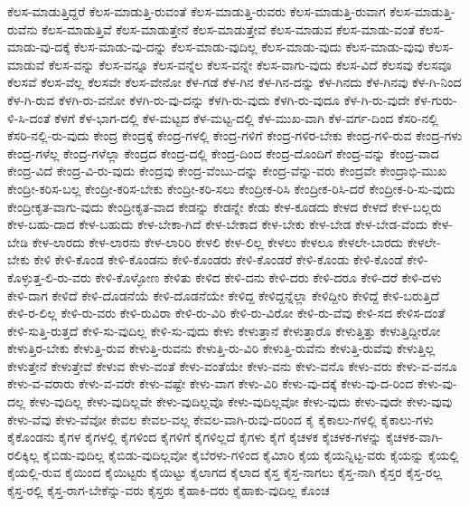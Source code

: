 {ಕೆಲಸ-ಮಾಡುತ್ತಿದ್ದರೆ
ಕೆಲಸ-ಮಾಡುತ್ತಿ-ರುವಂತೆ
ಕೆಲಸ-ಮಾಡುತ್ತಿ-ರುವರು
ಕೆಲಸ-ಮಾಡುತ್ತಿ-ರುವಾಗ
ಕೆಲಸ-ಮಾಡುತ್ತಿ-ರುವೆನು
ಕೆಲಸ-ಮಾಡುತ್ತಿವೆ
ಕೆಲಸ-ಮಾಡುತ್ತೇನೆ
ಕೆಲಸ-ಮಾಡುತ್ತೇವೆ
ಕೆಲಸ-ಮಾಡುವ
ಕೆಲಸ-ಮಾಡು-ವಂತೆ
ಕೆಲಸ-ಮಾಡು-ವು-ದಕ್ಕೆ
ಕೆಲಸ-ಮಾಡು-ವು-ದನ್ನು
ಕೆಲಸ-ಮಾಡು-ವುದಿಲ್ಲ
ಕೆಲಸ-ಮಾಡು-ವುದು
ಕೆಲಸ-ಮಾಡು-ವುವು
ಕೆಲಸ-ಮಾಡುವೆ
ಕೆಲಸ-ವನ್ನು
ಕೆಲಸ-ವನ್ನೂ
ಕೆಲಸ-ವನ್ನೆಲ
ಕೆಲಸ-ವನ್ನೇ
ಕೆಲಸ-ವಾಗು-ವುದು
ಕೆಲಸ-ವಿದೆ
ಕೆಲಸವು
ಕೆಲಸವೂ
ಕೆಲಸವೆ
ಕೆಲಸ-ವೆಲ್ಲ
ಕೆಲಸವೇ
ಕೆಲಸ-ವೇನೋ
ಕೆಳ-ಗಡೆ
ಕೆಳ-ಗಿನ
ಕೆಳ-ಗಿನ-ದನ್ನು
ಕೆಳ-ಗಿನದು
ಕೆಳ-ಗಿನವು
ಕೆಳ-ಗಿ-ನಿಂದ
ಕೆಳ-ಗಿ-ರುವ
ಕೆಳಗಿ-ರು-ವನೋ
ಕೆಳಗಿ-ರು-ವು-ದನ್ನು
ಕೆಳಗಿ-ರು-ವುದು
ಕೆಳಗಿ-ರು-ವುದೂ
ಕೆಳ-ಗಿ-ರು-ವುದೇ
ಕೆಳ-ಗುರು-ಳಿ-ಸಿ-ದಂತೆ
ಕೆಳಗೆ
ಕೆಳ-ಭಾಗ-ದಲ್ಲಿ
ಕೆಳ-ಮಟ್ಟದ
ಕೆಳ-ಮಟ್ಟ-ದಲ್ಲಿ
ಕೆಳ-ಮುಖ-ವಾಗಿ
ಕೆಳ-ವರ್ಗ-ದಿಂದ
ಕೆಸರಿ-ನಲ್ಲಿ
ಕೆಸರಿ-ನಲ್ಲಿ-ರು-ವುದು
ಕೇಂದ್ರ
ಕೇಂದ್ರಕ್ಕೆ
ಕೇಂದ್ರ-ಗಳಲ್ಲಿ
ಕೇಂದ್ರ-ಗಳಿಗೆ
ಕೇಂದ್ರ-ಗಳಿರ-ಬೇಕು
ಕೇಂದ್ರ-ಗಳಿ-ರುವ
ಕೇಂದ್ರ-ಗಳು
ಕೇಂದ್ರ-ಗಳೆಲ್ಲ
ಕೇಂದ್ರ-ಗಳೆಲ್ಲಾ
ಕೇಂದ್ರದ
ಕೇಂದ್ರ-ದಲ್ಲಿ
ಕೇಂದ್ರ-ದಿಂದ
ಕೇಂದ್ರ-ದೊಂದಿಗೆ
ಕೇಂದ್ರ-ವನ್ನು
ಕೇಂದ್ರ-ವಾದ
ಕೇಂದ್ರ-ವಿದೆ
ಕೇಂದ್ರ-ವಿ-ರು-ವುದು
ಕೇಂದ್ರವು
ಕೇಂದ್ರ-ವೆಂಬು-ದನ್ನು
ಕೇಂದ್ರ-ವೆನ್ನು-ವರು
ಕೇಂದ್ರವೇ
ಕೇಂದ್ರಾಭಿ-ಮುಖ
ಕೇಂದ್ರೀ-ಕರಿಸ-ಬಲ್ಲ
ಕೇಂದ್ರೀ-ಕರಿಸ-ಬೇಕು
ಕೇಂದ್ರೀ-ಕರಿ-ಸಲು
ಕೇಂದ್ರೀಕ-ರಿಸಿ
ಕೇಂದ್ರೀಕ-ರಿಸಿ-ದರೆ
ಕೇಂದ್ರೀಕ-ರಿ-ಸು-ವುದು
ಕೇಂದ್ರೀಕೃತ-ವಾಗು-ವುದು
ಕೇಂದ್ರೀಕೃತ-ವಾದ
ಕೇಡನ್ನು
ಕೇಡನ್ನೇ
ಕೇಡು
ಕೇಳ-ಕೂಡದು
ಕೇಳದ
ಕೇಳದೆ
ಕೇಳ-ಬಲ್ಲರು
ಕೇಳ-ಬಹು-ದಾದ
ಕೇಳ-ಬಹುದು
ಕೇಳ-ಬೇಕಾ-ಗಿದೆ
ಕೇಳ-ಬೇಕಾದ
ಕೇಳ-ಬೇಕು
ಕೇಳ-ಬೇಡ
ಕೇಳ-ಬೇಡ-ವೆಂದು
ಕೇಳ-ಬೇಡಿ
ಕೇಳ-ಲಾರದು
ಕೇಳ-ಲಾರನು
ಕೇಳ-ಲಾರಿರಿ
ಕೇಳಲಿ
ಕೇಳ-ಲಿಲ್ಲ
ಕೇಳಲು
ಕೇಳಲೂ
ಕೇಳಲೇ-ಬಾರದು
ಕೇಳಲೇ-ಬೇಕು
ಕೇಳಿ
ಕೇಳಿ-ಕೊಂಡ
ಕೇಳಿ-ಕೊಂಡನು
ಕೇಳಿ-ಕೊಂಡರು
ಕೇಳಿ-ಕೊಂಡರೆ
ಕೇಳಿ-ಕೊಂಡು
ಕೇಳಿ-ಕೊಂಡೆ
ಕೇಳಿ-ಕೊಳ್ಳುತ್ತ-ಲಿ-ರು-ವರು
ಕೇಳಿ-ಕೊಳ್ಳೋಣ
ಕೇಳಿತು
ಕೇಳಿದ
ಕೇಳಿ-ದನು
ಕೇಳಿ-ದರು
ಕೇಳಿ-ದರೂ
ಕೇಳಿ-ದರೆ
ಕೇಳಿ-ದಳು
ಕೇಳಿ-ದಾಗ
ಕೇಳಿದೆ
ಕೇಳಿ-ದೊಡನೆಯೆ
ಕೇಳಿ-ದೊಡನೆಯೇ
ಕೇಳಿದ್ದ
ಕೇಳಿದ್ದನ್ನೆಲ್ಲಾ
ಕೇಳಿದ್ದೀರಿ
ಕೇಳಿದ್ದೆ
ಕೇಳಿ-ಬರುತ್ತಿದೆ
ಕೇಳಿ-ರ-ಲಿಲ್ಲ
ಕೇಳಿ-ರು-ವರು
ಕೇಳಿ-ರುವಿರಾ
ಕೇಳಿ-ರು-ವಿರಿ
ಕೇಳಿ-ರು-ವಿರೋ
ಕೇಳಿ-ರು-ವೆವು
ಕೇಳಿ-ಸದ
ಕೇಳಿಸ-ದಂತೆ
ಕೇಳಿ-ಸುತ್ತಿ-ರುತ್ತದೆ
ಕೇಳಿ-ಸು-ವುದಿಲ್ಲ
ಕೇಳಿ-ಸು-ವುದು
ಕೇಳು
ಕೇಳುತ್ತಾನೆ
ಕೇಳುತ್ತಾರೊ
ಕೇಳುತ್ತಿತ್ತು
ಕೇಳುತ್ತಿದ್ದೀರೋ
ಕೇಳುತ್ತಿರ-ಬೇಕು
ಕೇಳುತ್ತಿ-ರುವ
ಕೇಳುತ್ತಿ-ರುವನು
ಕೇಳುತ್ತಿ-ರು-ವಿರಿ
ಕೇಳುತ್ತಿ-ರುವೆನು
ಕೇಳುತ್ತಿ-ರುವೆವು
ಕೇಳುತ್ತಿಲ್ಲ
ಕೇಳುತ್ತೇನೆ
ಕೇಳುತ್ತೇವೆ
ಕೇಳುವ
ಕೇಳು-ವಂತೆ
ಕೇಳು-ವಂತೆಯೇ
ಕೇಳು-ವನು
ಕೇಳು-ವನೊ
ಕೇಳು-ವರು
ಕೇಳು-ವ-ವನೂ
ಕೇಳು-ವ-ವರಾರು
ಕೇಳು-ವ-ವರೇ
ಕೇಳು-ವಷ್ಟೇ
ಕೇಳು-ವಾಗ
ಕೇಳು-ವಿರಿ
ಕೇಳು-ವು-ದಕ್ಕೆ
ಕೇಳು-ವು-ದ-ರಿಂದ
ಕೇಳು-ವು-ದಲ್ಲ
ಕೇಳು-ವುದಿಲ್ಲ
ಕೇಳು-ವುದಿಲ್ಲವೇ
ಕೇಳು-ವುದಿಲ್ಲವೊ
ಕೇಳು-ವುದಿಲ್ಲವೋ
ಕೇಳು-ವುದು
ಕೇಳು-ವುದೇ
ಕೇಳು-ವುವು
ಕೇಳು-ವೆವು
ಕೇಳು-ವೆವೋ
ಕೇವಲ
ಕೇವಲ-ವಲ್ಲ
ಕೇವಲ-ವಾಗಿ-ರುವು-ದರಿಂದ
ಕೈ
ಕೈಕಾಲು-ಗಳಲ್ಲಿ
ಕೈಕಾಲು-ಗಳು
ಕೈಕೊಂಡನು
ಕೈಗಳ
ಕೈಗಳಲ್ಲಿ
ಕೈಗಳಿಂದ
ಕೈಗಳಿಗೆ
ಕೈಗಳಿಲ್ಲದೆ
ಕೈಗಳು
ಕೈಗೆ
ಕೈಚಳಕ
ಕೈಚಳಕ-ಗಳನ್ನು
ಕೈಚಳಕ-ವಾಗಿ-ರಲಿಕ್ಕಿಲ್ಲ
ಕೈಬಿಡು-ವುದಿಲ್ಲ
ಕೈಬಿಡು-ವುದಿಲ್ಲವೋ
ಕೈಬೆರಳು-ಗಳಿಂದ
ಕೈಮಿಾರಿ
ಕೈಯ
ಕೈಯನ್ನಿಟ್ಟ-ವರು
ಕೈಯನ್ನು
ಕೈಯಲ್ಲಿ
ಕೈಯಲ್ಲಿ-ರುವ
ಕೈಯಿಂದ
ಕೈಯಿಟ್ಟರು
ಕೈಯಿಟ್ಟು
ಕೈಲಾಗದ
ಕೈಲಾದ
ಕೈಸ್ತ
ಕೈಸ್ತ-ನಾಗಲು
ಕೈಸ್ತ-ನಾಗಿ
ಕೈಸ್ತರ
ಕೈಸ್ತ-ರಲ್ಲ
ಕೈಸ್ತ-ರಲ್ಲಿ
ಕೈಸ್ತ-ರಾಗ-ಬೇಕೆನ್ನು-ವರು
ಕೈಸ್ತರು
ಕೈಹಾಕಿ-ದರು
ಕೈಹಾಕು-ವುದಿಲ್ಲ
ಕೊಂಚ
}
